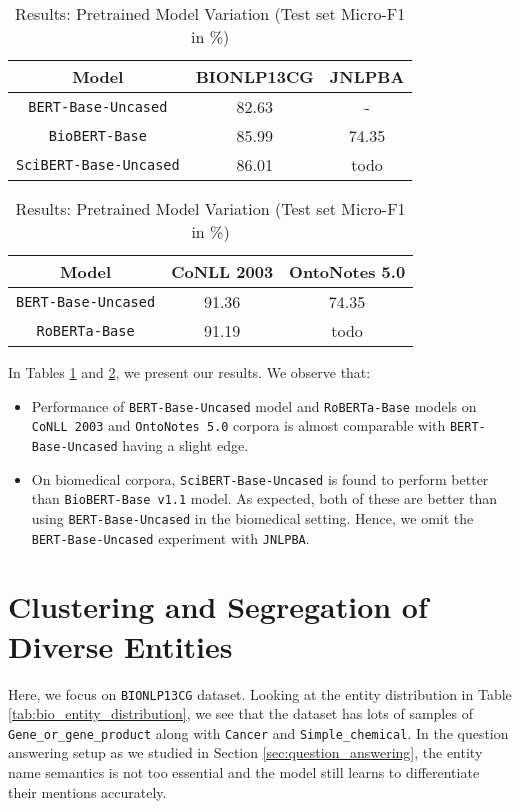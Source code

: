 \begin{table}[h!]
\centering
\begin{tabular}{|c|c|c|}\hline
	\textbf{Model} & \textbf{BIONLP13CG} & \textbf{JNLPBA}\\\hline
	\texttt{BERT-Base-Uncased} & 82.63 & -\\\hline
	\texttt{BioBERT-Base} & 85.99 & 74.35\\\hline
	\texttt{SciBERT-Base-Uncased} & 86.01 & todo\\\hline
	\end{tabular}
    \caption{Results: Pretrained Model Variation (Test set Micro-F1 in \%)}
    \label{tab:res_pretrained_model_bio}
\end{table}

\begin{table}[h!]
\centering
\begin{tabular}{|c|c|c|}\hline
	\textbf{Model} & \textbf{CoNLL 2003} & \textbf{OntoNotes 5.0}\\\hline
	\texttt{BERT-Base-Uncased} & 91.36 & 74.35\\\hline
	\texttt{RoBERTa-Base} & 91.19 & todo\\\hline
	\end{tabular}
    \caption{Results: Pretrained Model Variation (Test set Micro-F1 in \%)}
    \label{tab:res_pretrained_model_general}
\end{table}

In Tables \ref{tab:res_pretrained_model_bio} and \ref{tab:res_pretrained_model_general}, we present our results. We observe that:

\begin{itemize}
    \item Performance of \texttt{BERT-Base-Uncased} model and \texttt{RoBERTa-Base} models on \texttt{CoNLL 2003} and \texttt{OntoNotes 5.0} corpora is almost comparable with \texttt{BERT-Base-Uncased} having a slight edge.
    
    \item On biomedical corpora, \texttt{SciBERT-Base-Uncased} is found to perform better than \texttt{BioBERT-Base v1.1} model. As expected, both of these are better than using \texttt{BERT-Base-Uncased} in the biomedical setting. Hence, we omit the \texttt{BERT-Base-Uncased} experiment with \texttt{JNLPBA}.
\end{itemize}

\section{Clustering and Segregation of Diverse Entities}
Here, we focus on \texttt{BIONLP13CG} dataset. Looking at the entity distribution in Table \ref{tab:bio_entity_distribution}, we see that the dataset has lots of samples of \texttt{Gene\_or\_gene\_product} along with \texttt{Cancer} and \texttt{Simple\_chemical}. In the question answering setup as we studied in Section \ref{sec:question_answering}, the entity name semantics is not too essential and the model still learns to differentiate their mentions accurately. 


